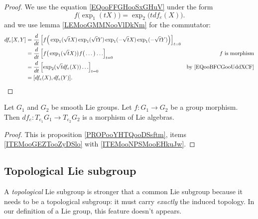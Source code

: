 \begin{proof}
	We use the equation \eqref{EQooFFGHooSxGHuV} under the form
	\begin{equation}		\label{EQooBFCGooUddXCF}
		f\big( \exp_1(tX) \big)=\exp_2\big( tdf_e(X) \big).
	\end{equation}
	and we use lemma \ref{LEMooGMMNooVlDkNm} for the commutator:
	\begin{subequations}
		\begin{align}
			df_e[X,Y] & =\frac{d}{dt} \left[ f\Big( \exp_1(\sqrt{t}X)\exp_1(\sqrt{t}Y)\exp_1(-\sqrt{t}X)\exp_1(-\sqrt{t}Y) \Big)  \right]_{t=0}                                      \\
			          & =\frac{d}{dt} \left[ f\big( \exp_1(\sqrt{t}X) \big)f\big( \ldots \big)\ldots  \right]_{t=0}                             & \text{\( f\) is morphism}          \\
			          & =\frac{d}{dt} \left[ \exp_2(\sqrt{t}df_e(X))\ldots  \right]_{t=0}                                                       & \text{by \eqref{EQooBFCGooUddXCF}} \\
			          & =[df_e(X),df_e(Y)].
		\end{align}
	\end{subequations}
\end{proof}

\begin{proposition}	\label{PROPooPLBSooNOOmbm}
	Let \( G_1\) and \( G_2\) be smooth Lie groups. Let \(f \colon G_1\to G_2  \) be a group morphism. Then \(df_e \colon T_{e_1}G_1\to T_{e_2}G_2  \) is a morphism of Lie algebras.
\end{proposition}

\begin{proof}
	This is proposition \ref{PROPooYHTQooDSsftm}, items \ref{ITEMooGEZTooZyDSlo} with \ref{ITEMooNPSMooEHkuJw}.
\end{proof}



\subsection{Topological Lie subgroup}

\begin{remark}
	A \textit{topological} Lie subgroup is stronger that a common Lie subgroup because it needs to be a topological subgroup: it must carry \emph{exactly} the induced topology. In our definition of a Lie group, this feature doesn't appears.
\end{remark}

